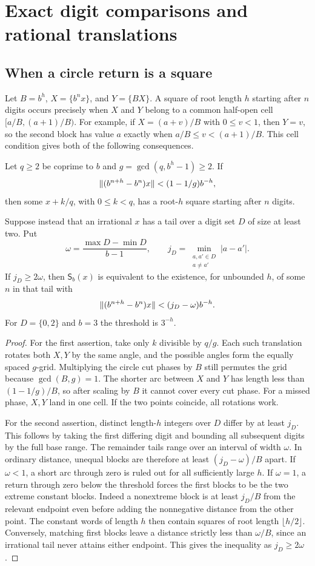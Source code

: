 \section{Exact digit comparisons and rational translations}\label{sec:geometric}

\subsection{When a circle return is a square}
Let $B=b^h$, $X=\{b^nx\}$, and $Y=\{BX\}$. A square of root length $h$ starting after $n$ digits occurs precisely when $X$ and $Y$ belong to a common half-open cell $[a/B,(a+1)/B)$. For example, if $X=(a+v)/B$ with $0\le v<1$, then $Y=v$, so the second block has value $a$ exactly when $a/B\le v<(a+1)/B$. This cell condition gives both of the following consequences.

\begin{proposition}\label{prop:circle}
Let $q\ge2$ be coprime to $b$ and $g=\gcd(q,b^h-1)\ge2$. If
\[
 \lVert(b^{n+h}-b^n)x\rVert< (1-1/g)b^{-h},
\]
then some $x+k/q$, with $0\le k<q$, has a root-$h$ square starting after $n$ digits.

Suppose instead that an irrational $x$ has a tail over a digit set $D$ of size at least two. Put
\[
 \omega=\frac{\max D-\min D}{b-1},
 \qquad j_D=\min_{\substack{a,a'\in D\\a\ne a'}}|a-a'|.
\]
If $j_D\ge2\omega$, then $\mathsf S_b(x)$ is equivalent to the existence, for unbounded $h$, of some $n$ in that tail with
\[
 \lVert(b^{n+h}-b^n)x\rVert<(j_D-\omega)b^{-h}.
\]
For $D=\{0,2\}$ and $b=3$ the threshold is $3^{-h}$.
\end{proposition}

\begin{proof}
For the first assertion, take only $k$ divisible by $q/g$. Each such translation rotates both $X,Y$ by the same angle, and the possible angles form the equally spaced $g$-grid. Multiplying the circle cut phases by $B$ still permutes the grid because $\gcd(B,g)=1$. The shorter arc between $X$ and $Y$ has length less than $(1-1/g)/B$, so after scaling by $B$ it cannot cover every cut phase. For a missed phase, $X,Y$ land in one cell. If the two points coincide, all rotations work.

For the second assertion, distinct length-$h$ integers over $D$ differ by at least $j_D$. This follows by taking the first differing digit and bounding all subsequent digits by the full base range. The remainder tails range over an interval of width $\omega$. In ordinary distance, unequal blocks are therefore at least $(j_D-\omega)/B$ apart. If $\omega<1$, a short arc through zero is ruled out for all sufficiently large $h$. If $\omega=1$, a return through zero below the threshold forces the first blocks to be the two extreme constant blocks. Indeed a nonextreme block is at least $j_D/B$ from the relevant endpoint even before adding the nonnegative distance from the other point. The constant words of length $h$ then contain squares of root length $\lfloor h/2\rfloor$. Conversely, matching first blocks leave a distance strictly less than $\omega/B$, since an irrational tail never attains either endpoint. This gives the inequality as $j_D\ge2\omega$.
\end{proof}

